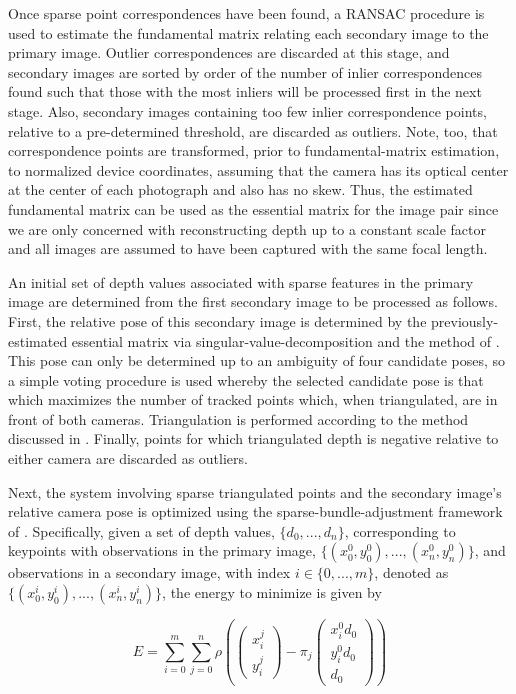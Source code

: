 \documentclass[conference]{acmsiggraph}
\begin{document}
Once sparse point correspondences have been found, a RANSAC procedure
is used to estimate the fundamental matrix relating each secondary
image to the primary image.  Outlier correspondences are discarded at this
stage, and secondary images are sorted by order of the number of inlier
correspondences found such that those with the most inliers will
be processed first in the next stage.  Also, secondary images containing
too few inlier correspondence points, relative to a pre-determined
threshold, are discarded as outliers.  Note, too, that correspondence
points are transformed, prior to fundamental-matrix estimation, to normalized
device coordinates, assuming that the camera has its optical center at the center of each
photograph and also has no skew.  Thus, the estimated fundamental matrix
can be used as the essential matrix for the image pair since
we are only concerned with reconstructing depth up to a constant scale
factor and all images are assumed to have been captured with the
same focal length.

An initial set of depth values associated with sparse features in
the primary image are determined from the first secondary image
to be processed as follows.  First, the relative pose of this secondary
image is determined by the previously-estimated essential matrix via
singular-value-decomposition and the method of \cite{hartley2003multiple}.
This pose can only be determined up to an ambiguity of four candidate poses,
so a simple voting procedure is used whereby the selected candidate pose is
that which maximizes the number of tracked points which, when triangulated,
are in front of both cameras.  Triangulation is performed according to the
method discussed in \cite{hartley1997triangulation}.  Finally, points
for which triangulated depth is negative relative to either camera
are discarded as outliers.

Next, the system involving sparse triangulated points and the secondary
image's relative camera pose is optimized using the sparse-bundle-adjustment
framework of \cite{ceres-solver}.  Specifically, given a set of depth values,
$\{d_0, ..., d_n\}$, corresponding to keypoints with observations in the
primary image, $\{(x_0^0, y_0^0), ..., (x_n^0, y_n^0)\}$, and observations
in a secondary image, with index $i \in \{0, ..., m\}$, denoted as
$\{(x_0^i, y_0^i), ..., (x_n^i, y_n^i)\}$, the energy to minimize is
given by

\begin{equation}
    \label{eq:sfm}
    E = \sum_{i=0}^{m} \sum_{j=0}^{n}
    \rho \left(
    \begin{pmatrix}
        x_i^j\\
        y_i^j
    \end{pmatrix}
    -
    \pi_j
    \begin{pmatrix}
        x_i^0 d_0\\
        y_i^0 d_0\\
        d_0
    \end{pmatrix}
    \right)
\end{equation}
\end{document}
